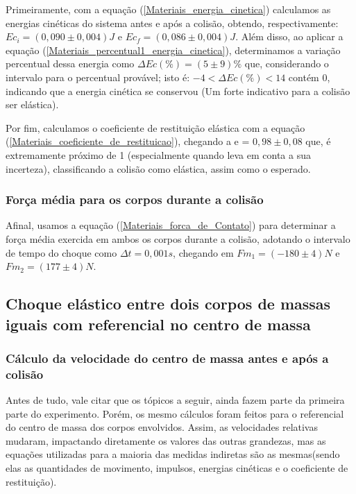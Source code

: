 \documentclass[12pt, twoside]{article}
\begin{document}
    Primeiramente, com a equação (\ref{Materiais_energia_cinetica}) calculamos as energias cinéticas do sistema antes e após a colisão, obtendo, respectivamente: $Ec_{i} = (0,090 \pm 0,004)J$ e $Ec_{f} = (0,086 \pm 0,004)J$. Além disso, ao aplicar a equação (\ref{Materiais_percentual1_energia_cinetica}), determinamos a variação percentual dessa energia como $\Delta Ec(\%) = (5 \pm 9)\%$ que, considerando o intervalo para o percentual provável; isto é: $-4 < \Delta Ec(\%) < 14$ contém $0$, indicando que a energia cinética se conservou (Um forte indicativo para a colisão ser elástica).

    Por fim, calculamos o coeficiente de restituição elástica com a equação (\ref{Materiais_coeficiente_de_restituicao}), chegando a e = $0,98 \pm 0,08$ que, é extremamente próximo de 1 (especialmente quando leva em conta a sua incerteza), classificando a colisão como elástica, assim como o esperado.

\subsubsection{Força média para os corpos durante a colisão}

    Afinal, usamos a equação (\ref{Materiais_forca_de_Contato}) para determinar a força média exercida em ambos os corpos durante a colisão, adotando o intervalo de tempo do choque como $\Delta t = 0,001 s$, chegando em $Fm_1 = (-180 \pm 4) N$ e $Fm_2 = (177 \pm 4)N$.
    

\subsection{Choque elástico entre dois corpos de massas iguais com referencial no centro de massa}

\subsubsection{Cálculo da velocidade do centro de massa antes e após a colisão}

    Antes de tudo, vale citar que os tópicos a seguir, ainda fazem parte da primeira parte do experimento. Porém, os mesmo cálculos foram feitos para o referencial do centro de massa dos corpos envolvidos. Assim, as velocidades relativas mudaram, impactando diretamente os valores das outras grandezas, mas as equações utilizadas para a maioria das medidas indiretas são as mesmas(sendo elas as quantidades de movimento, impulsos, energias cinéticas e o coeficiente de restituição).
\end{document}
